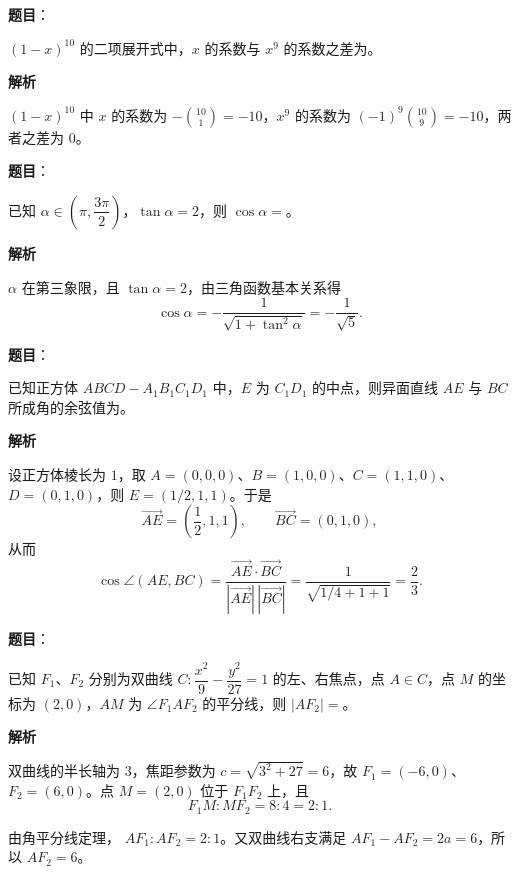 \begin{answer}

\textbf{题目}：

$(1-x)^{10}$ 的二项展开式中，$x$ 的系数与 $x^9$ 的系数之差为\gkblank{}。

\textbf{解析}

$(1-x)^{10}$ 中 $x$ 的系数为 $-\binom{10}{1}=-10$，$x^9$ 的系数为
$(-1)^9\binom{10}{9}=-10$，两者之差为 $0$。


\end{answer}
\begin{answer}

\textbf{题目}：

已知 $\alpha\in\left(\pi,\dfrac{3\pi}{2}\right)$，$\tan\alpha=2$，则 $\cos\alpha=$\gkblank{}。

\textbf{解析}

$\alpha$ 在第三象限，且 $\tan\alpha=2$，由三角函数基本关系得
\nopagebreak[4]
\[
\cos\alpha=-\frac1{\sqrt{1+\tan^2\alpha}}
=-\frac1{\sqrt5}.
\]


\end{answer}
\begin{answer}

\textbf{题目}：

已知正方体 $ABCD-A_1B_1C_1D_1$ 中，$E$ 为 $C_1D_1$ 的中点，则异面直线 $AE$ 与 $BC$ 所成角的余弦值为\gkblank{}。

\textbf{解析}

设正方体棱长为 $1$，取
$A=(0,0,0)$、$B=(1,0,0)$、$C=(1,1,0)$、$D=(0,1,0)$，则
$E=(1/2,1,1)$。于是
\nopagebreak[4]
\[
\overrightarrow{AE}=\left(\frac12,1,1\right),\qquad
\overrightarrow{BC}=(0,1,0),
\]
从而
\nopagebreak[4]
\[
\cos\angle(AE,BC)
=\frac{\overrightarrow{AE}\cdot\overrightarrow{BC}}
{|\overrightarrow{AE}|\,|\overrightarrow{BC}|}
=\frac1{\sqrt{1/4+1+1}}=\frac23.
\]


\end{answer}
\begin{answer}

\textbf{题目}：

已知 $F_1\text{、}F_2$ 分别为双曲线 $C:\dfrac{x^2}{9}-\dfrac{y^2}{27}=1$ 的左、右焦点，点 $A\in C$，点 $M$ 的坐标为 $(2,0)$，$AM$ 为 $\angle F_1AF_2$ 的平分线，则 $|AF_2|=$\gkblank{}。

\textbf{解析}

双曲线的半长轴为 $3$，焦距参数为
$c=\sqrt{3^2+27}=6$，故
$F_1=(-6,0)$、$F_2=(6,0)$。点 $M=(2,0)$ 位于
$F_1F_2$ 上，且
\nopagebreak[4]
\[
F_1M:MF_2=8:4=2:1.
\]

由角平分线定理，
$AF_1:AF_2=2:1$。又双曲线右支满足
$AF_1-AF_2=2a=6$，所以 $AF_2=6$。


\end{answer}
